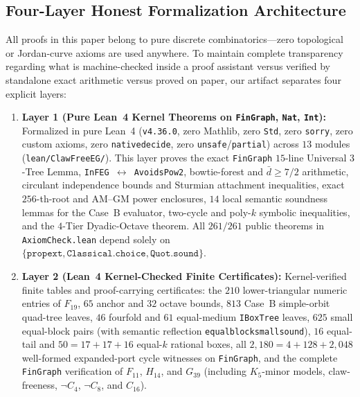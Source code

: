 \documentclass[11pt,reqno]{amsart}
\theoremstyle{plain}
\theoremstyle{definition}
\theoremstyle{remark}
\DeclareRobustCommand{\_}{\ifmmode\text{\textunderscore}\else\textunderscore\allowbreak\fi}
\begin{document}
\subsection{Four-Layer Honest Formalization Architecture}\label{subsec:honest-arch}

All proofs in this paper belong to pure discrete combinatorics---zero topological or Jordan-curve axioms are used anywhere. To maintain complete transparency regarding what is machine-checked inside a proof assistant versus verified by standalone exact arithmetic versus proved on paper, our artifact separates four explicit layers:
\begin{enumerate}[label=(\roman*),leftmargin=2.2em]
  \item \textbf{Layer 1 (Pure Lean~4 Kernel Theorems on \texttt{FinGraph}, \texttt{Nat}, \texttt{Int}):} Formalized in pure Lean~4 (\texttt{v4.36.0}, zero Mathlib, zero \texttt{Std}, zero \texttt{sorry}, zero custom axioms, zero \texttt{native\_decide}, zero \texttt{unsafe}/\texttt{partial}) across $13$ modules (\texttt{lean/ClawFreeEG/}). This layer proves the exact \texttt{FinGraph} $15$-line Universal $3$-Tree Lemma, \texttt{InFEG $\leftrightarrow$ AvoidsPow2}, bowtie-forest and $\bar{d} \ge 7/2$ arithmetic, circulant independence bounds and Sturmian attachment inequalities, exact $256$-th-root and AM--GM power enclosures, $14$ local semantic soundness lemmas for the Case~B evaluator, two-cycle and poly-$k$ symbolic inequalities, and the $4$-Tier Dyadic-Octave theorem. All $261/261$ public theorems in \texttt{AxiomCheck.lean} depend solely on $\{\texttt{propext}, \texttt{Classical.choice}, \texttt{Quot.sound}\}$.
  \item \textbf{Layer 2 (Lean~4 Kernel-Checked Finite Certificates):} Kernel-verified finite tables and proof-carrying certificates: the $210$ lower-triangular numeric entries of $F_{19}$, $65$ anchor and $32$ octave bounds, $813$ Case~B simple-orbit quad-tree leaves, $46$ fourfold and $61$ equal-medium \texttt{IBoxTree} leaves, $625$ small equal-block pairs (with semantic reflection \texttt{equal\_block\_small\_625\_sound}), $16$ equal-tail and $50 = 17+17+16$ equal-$k$ rational boxes, all $2{,}180 = 4 + 128 + 2{,}048$ well-formed expanded-port cycle witnesses on \texttt{FinGraph}, and the complete \texttt{FinGraph} verification of $F_{11}$, $H_{14}$, and $G_{39}$ (including $K_5$-minor models, claw-freeness, $\neg C_4$, $\neg C_8$, and $C_{16}$).

\end{enumerate}
\end{document}
